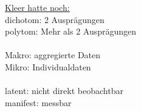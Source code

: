 \vspace{0.5cm}
\underline{Kleer hatte noch:}
\\dichotom: 2 Ausprägungen
\\polytom: Mehr als 2 Ausprägungen
\\
\\Makro: aggregierte Daten
\\Mikro: Individualdaten
\\
\\latent: nicht direkt beobachtbar
\\manifest: messbar
\\

